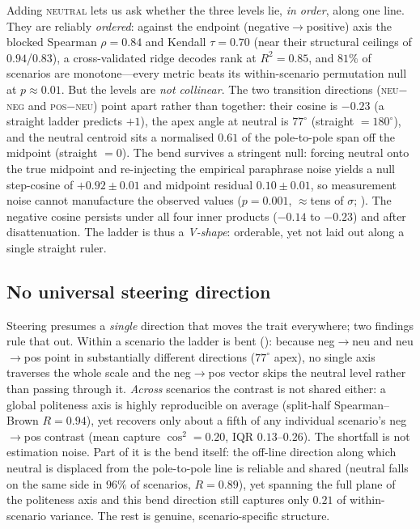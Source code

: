 \documentclass{article}
\begin{document}
Adding \textsc{neutral} lets us ask whether the three levels lie, \emph{in
order}, along one line. They are reliably \emph{ordered}: against the endpoint
(negative$\to$positive) axis the blocked Spearman $\rho=0.84$ and Kendall
$\tau=0.70$ (near their structural ceilings of $0.94$/$0.83$), a cross-validated
ridge decodes rank at $R^2=0.85$, and $81\%$ of scenarios are monotone---every
metric beats its within-scenario permutation null at $p\approx0.01$. But the
levels are \emph{not collinear}. The two transition directions
(\textsc{neu}$-$\textsc{neg} and \textsc{pos}$-$\textsc{neu}) point apart rather
than together: their cosine is $-0.23$ (a straight ladder predicts $+1$), the
apex angle at neutral is $77^\circ$ (straight $=180^\circ$), and the neutral
centroid sits a normalised $0.61$ of the pole-to-pole span off the midpoint
(straight $=0$). The bend survives a stringent null: forcing neutral onto the
true midpoint and re-injecting the empirical paraphrase noise yields a null
step-cosine of $+0.92{\pm}0.01$ and midpoint residual $0.10{\pm}0.01$, so
measurement noise cannot manufacture the observed values
($p=0.001$, $\approx$tens of $\sigma$; ). The negative cosine
persists under all four inner products ($-0.14$ to $-0.23$) and after
disattenuation. The ladder is thus a \emph{V-shape}: orderable, yet not laid out
along a single straight ruler.

\subsection{No universal steering direction}\label{subsec:steering}

Steering presumes a \emph{single} direction that moves the trait everywhere; two
findings rule that out. Within a scenario the ladder is bent
(): because neg$\to$neu and neu$\to$pos point in
substantially different directions ($77^\circ$ apex), no single axis traverses
the whole scale and the neg$\to$pos vector skips the neutral level rather than
passing through it. \emph{Across} scenarios the contrast is not shared either: a
global politeness axis is highly reproducible on average (split-half
Spearman--Brown $R=0.94$), yet recovers only about a fifth of any individual
scenario's neg$\to$pos contrast (mean capture $\cos^2=0.20$, IQR $0.13$--$0.26$).
The shortfall is not estimation noise. Part of it is the bend itself: the
off-line direction along which neutral is displaced from the pole-to-pole line is
reliable and shared (neutral falls on the same side in $96\%$ of scenarios,
$R=0.89$), yet spanning the full plane of the politeness axis and this bend
direction still captures only $0.21$ of within-scenario variance. The rest is genuine, scenario-specific structure. 
\end{document}
